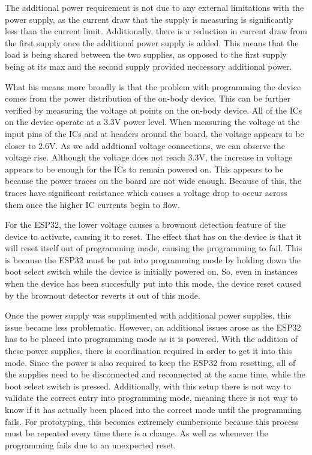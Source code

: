 The additional power requirement is not due to any external limitations with the power supply,
as the current draw that the supply is measuring is significantly less than the current limit.
Additionally, there is a reduction in current draw from the first supply once the additional power supply is added.
This means that the load is being shared between the two supplies,
as opposed to the first supply being at its max and the second supply provided neccessary additional power.

What his means more broadly is that the problem with programming the device comes from the power distribution of the on-body device.
This can be further verified by measuring the voltage at points on the on-body device.
All of the ICs on the device operate at a 3.3V power level.
When measuring the voltage at the input pins of the ICs and at headers around the board, the voltage appears to be closer to 2.6V.
As we add addtional voltage connections, we can observe the voltage rise.
Although the voltage does not reach 3.3V, the increase in voltage appears to be enough for the ICs to remain powered on.
This appears to be because the power traces on the board are not wide enough.
Because of this, the traces have significant resistance which causes a voltage drop to occur across them once the higher IC currents begin to flow.

For the ESP32, the lower voltage causes a brownout detection feature of the device to activate, causing it to reset.
The effect that has on the device is that it will reset itself out of programming mode, causing the programming to fail.
This is because the ESP32 must be put into programming mode by holding down the boot select switch while the device is initially powered on.
So, even in instances when the device has been succesfully put into this mode,
the device reset caused by the brownout detector reverts it out of this mode.

Once the power supply was supplimented with additional power supplies, this issue became less problematic.
However, an additional issues arose as the ESP32 has to be placed into programming mode as it is powered.
With the addition of these power supplies, there is coordination required in order to get it into this mode.
Since the power is also required to keep the ESP32 from resetting, all of the supplies need to be disconnected and reconnected at the same time,
while the boot select switch is pressed.
Additionally, with this setup there is not way to validate the correct entry into programming mode,
meaning there is not way to know if it has actually been placed into the correct mode until the programming fails.
For prototyping, this becomes extremely cumbersome because this process must be repeated every time there is a change.
As well as whenever the programming fails due to an unexpected reset.

